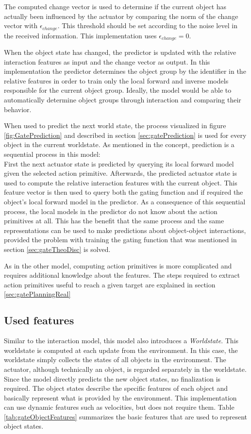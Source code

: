 The computed change vector is used to determine if the current object has actually been influenced by the actuator by comparing the norm of the change vector with $\epsilon_{change}$. This threshold should be set according to the noise level in the received information. This implementation uses $\epsilon_{change} = 0$.

When the object state has changed, the predictor is updated with the relative interaction features as input and the change vector as output. In this implementation the predictor determines the object group by the identifier in the relative features in order to train only the local forward and inverse models responsible for the current object group. Ideally, the model would be able to automatically determine object groups through interaction and comparing their behavior.

When used to predict the next world state, the process visualized in figure \ref{fig:GatePrediction} and described in section \ref{sec:gatePrediction} is used for every object in the current worldstate. As mentioned in the concept, prediction is a sequential process in this model: \\
First the next actuator state is predicted by querying its local forward model given the selected action primitive. Afterwards, the predicted actuator state is used to compute the relative interaction features with the current object. This feature vector is then used to query both the gating function and if required the object's local forward model in the predictor. 
As a consequence of this sequential process, the local models in the predictor do not know about the action primitives at all. This has the benefit that the same process and the same representations can be used to make predictions about object-object interactions, provided the problem with training the gating function that was mentioned in section \ref{sec:gateTheoDisc} is solved.

As in the other model, computing action primitives is more complicated and requires additional knowledge about the features. The steps required to extract action primitives useful to reach a given target are explained in section \ref{sec:gatePlanningReal}

\subsection{Used features \label{sec:gateFeatures}}

Similar to the interaction model, this model also introduces a \textit{Worldstate}. This worldstate is computed at each update from the environment. In this case, the worldstate simply collects the states of all objects in the environment. The actuator, although technically an object, is regarded separately in the worldstate. Since the model directly predicts the new object states, no finalization is required. 
The object states describe the specific features of each object and basically represent what is provided by the environment. This implementation can use dynamic features such as velocities, but does not require them. Table \ref{tab:gateObjectFeatures} summarizes the basic features that are used to represent object states.

